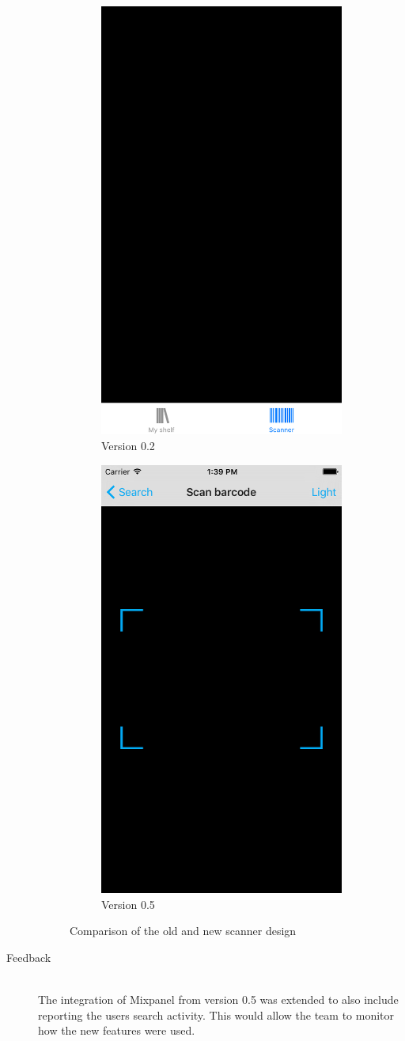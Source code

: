 \begin{description}
\begin{figure}
\centering
\begin{subfigure}{.5\textwidth}
  \centering
  \includegraphics[width=.4\textwidth]{figs/v02/ios-scanner-view.png}
  \caption{Version 0.2}
  \label{fig:ios-scanner-view-2}
\end{subfigure}%
\begin{subfigure}{.5\textwidth}
  \centering
  \includegraphics[width=.4\textwidth]{figs/v05/ios-scanner-view.png}
  \caption{Version 0.5}
  \label{fig:ios-scanner-view-results-5}
\end{subfigure}
\caption{Comparison of the old and new scanner design}
\label{fig:ios-scanner-view-comparison-5}
\end{figure}


    \item[Feedback] \hfill\\
The integration of Mixpanel from version 0.5 was extended to also include reporting the users search activity. This would allow the team to monitor how the new features were used.
\end{description}

